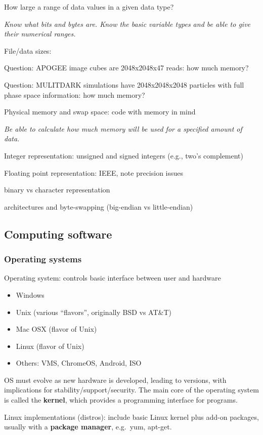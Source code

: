 \documentclass{article}
\newcommand{\test}[1]{%
    \begin{center}
        \colorbox{hl}{\parbox{0.9\textwidth}{\emph{\centering #1}}}
    \end{center}}
\begin{document}
How large a range of data values in a given data type?

\test{Know what bits and bytes are. Know the basic variable types and be
able to give their numerical ranges.}

File/data sizes:

Question: APOGEE image cubes are 2048x2048x47 reads: how much memory?

Question: MULITDARK simulations have 2048x2048x2048 particles with
full phase space information: how much memory?

Physical memory and swap space: code with memory in mind

\test{Be able to calculate how much memory will be used for a
specified amount of data.}

Integer representation: unsigned and signed integers (e.g., two's
complement)

Floating point representation: IEEE, note precision issues

binary vs character representation

architectures and byte-swapping (big-endian vs little-endian)

\subsection{Computing software}
\subsubsection{Operating systems}
Operating system: controls basic interface between user and hardware
\begin{itemize}
    \item Windows
    \item Unix (various ``flavors'', originally BSD vs AT\&T)
    \item Mac OSX (flavor of Unix)
    \item Linux (flavor of Unix)
    \item Others: VMS, ChromeOS, Android, ISO
\end{itemize}
OS must evolve as new hardware is developed, leading to versions, with
implications for stability/support/security. The main core of the
operating system is called the {\bf kernel}, which provides a programming
interface for programs.

Linux implementations (distros): include basic Linux kernel plus
add-on packages, usually with a {\bf package manager}, e.g.\ yum, apt-get.
\end{document}
